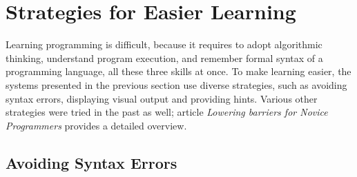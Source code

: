 %




\section{Strategies for Easier Learning}
\label{sec:strategies-for-easier-learning}

Learning programming is difficult,
  because it requires
  to adopt algorithmic thinking,
  understand program execution,
  and remember formal syntax of a programming language,
  all these three skills at once. %
To make learning easier,
  the systems presented in the previous section use diverse strategies,
  such as avoiding syntax errors,
  displaying visual output
  and providing hints.
Various other strategies were tried in the past as well;
article \emph{Lowering barriers for Novice Programmers}
  \cite{lowering-barriers}
  provides a detailed overview.


\subsection{Avoiding Syntax Errors}
\label{sec:avoiding-syntax-errors}

